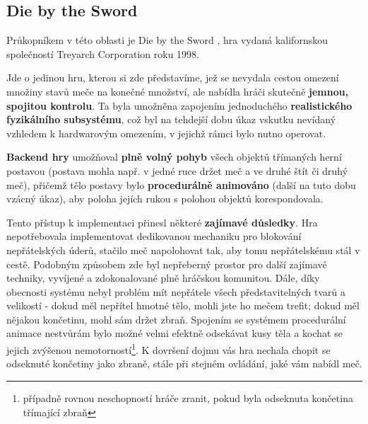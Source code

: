 \subsection{Die by the Sword} \label{dieByTheSwordDescriptionSubsection}

Průkopníkem v této oblasti je Die by the Sword \cite{DieByTheSword}, hra vydaná kalifornskou společností Treyarch Corporation roku 1998. 

Jde o jedinou hru, kterou si zde představíme, jež se nevydala cestou omezení množiny stavů meče na konečné množství, ale nabídla hráči skutečně \textbf{jemnou, spojitou kontrolu}. Ta byla umožněna zapojením jednoduchého \textbf{realistického fyzikálního subsystému}, což byl na tehdejší dobu úkaz vskutku nevídaný vzhledem k hardwarovým omezením, v jejichž rámci bylo nutno operovat.

\textbf{Backend hry} umožňoval \textbf{plně volný pohyb} všech objektů třímaných herní postavou (postava mohla např. v jedné ruce držet meč a ve druhé štít či druhý meč), přičemž tělo postavy bylo \textbf{procedurálně animováno} (další na tuto dobu vzácný úkaz), aby poloha jejích rukou s polohou objektů korespondovala.

Tento přístup k implementaci přinesl některé \textbf{zajímavé důsledky}. Hra nepotřebovala implementovat dedikovanou mechaniku pro blokování nepřátelských úderů, stačilo meč napolohovat tak, aby tomu nepřátelskému stál v cestě. Podobným způsobem zde byl nepřeberný prostor pro další zajímavé techniky, vyvíjené a zdokonalované plně hráčskou komunitou. Dále, díky obecnosti systému nebyl problém mít nepřátele všech představitelných tvarů a velikostí - dokud měl nepřítel hmotné tělo, mohli jste ho mečem trefit; dokud měl nějakou končetinu, mohl sám držet zbraň. Spojením se systémem procedurální animace nestvůrám bylo možné velmi efektně odsekávat kusy těla a kochat se jejich zvýšenou nemotorností\footnote{případně rovnou neschopností hráče zranit, pokud byla odseknuta končetina třímající zbraň}. K dovršení dojmu vás hra nechala chopit se odseknuté končetiny jako zbraně, stále při stejném ovládání, jaké vám nabídl meč.

